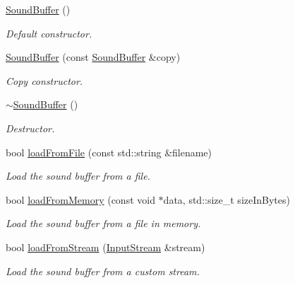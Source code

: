 \begin{DoxyCompactItemize}
\item 
\mbox{\label{classsf_1_1_sound_buffer_a0cabfbfe19b831bf7d5c9592d92ef233}} 
\hyperlink{classsf_1_1_sound_buffer_a0cabfbfe19b831bf7d5c9592d92ef233}{Sound\+Buffer} ()
\begin{DoxyCompactList}\small\item\em Default constructor. \end{DoxyCompactList}\item 
\hyperlink{classsf_1_1_sound_buffer_aaf000fc741ff27015907e8588263f4a6}{Sound\+Buffer} (const \hyperlink{classsf_1_1_sound_buffer}{Sound\+Buffer} \&copy)
\begin{DoxyCompactList}\small\item\em Copy constructor. \end{DoxyCompactList}\item 
\mbox{\label{classsf_1_1_sound_buffer_aea240161724ffba74a0d6a9e277d3cd5}} 
\hyperlink{classsf_1_1_sound_buffer_aea240161724ffba74a0d6a9e277d3cd5}{$\sim$\+Sound\+Buffer} ()
\begin{DoxyCompactList}\small\item\em Destructor. \end{DoxyCompactList}\item 
bool \hyperlink{classsf_1_1_sound_buffer_a2be6a8025c97eb622a7dff6cf2594394}{load\+From\+File} (const std\+::string \&filename)
\begin{DoxyCompactList}\small\item\em Load the sound buffer from a file. \end{DoxyCompactList}\item 
bool \hyperlink{classsf_1_1_sound_buffer_af8cfa5599739a7edae69c5cba273d33f}{load\+From\+Memory} (const void $\ast$data, std\+::size\+\_\+t size\+In\+Bytes)
\begin{DoxyCompactList}\small\item\em Load the sound buffer from a file in memory. \end{DoxyCompactList}\item 
bool \hyperlink{classsf_1_1_sound_buffer_ad292156b1e01f6dabd4c0c277d5e079e}{load\+From\+Stream} (\hyperlink{classsf_1_1_input_stream}{Input\+Stream} \&stream)
\begin{DoxyCompactList}\small\item\em Load the sound buffer from a custom stream. \end{DoxyCompactList}\item 

\end{DoxyCompactItemize}
